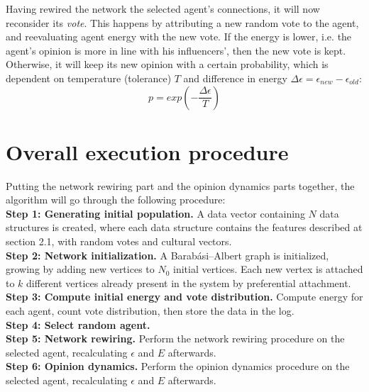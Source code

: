 \documentclass[12pt,openright,twoside]{book}
\begin{document}
Having rewired the network the selected agent's connections, it will now reconsider its \textit{vote}. This happens by attributing a new random vote to the agent, and reevaluating agent energy with the new vote. If the energy is lower, i.e. the agent's opinion is more in line with his influencers', then the new vote is kept. Otherwise, it will keep its new opinion with a certain probability, which is dependent on temperature (tolerance) $T$ and difference in energy $\Delta\epsilon=\epsilon_{new}-\epsilon_{old}$:\\

\begin{equation}
p=exp(-\frac{\Delta\epsilon}{T})
\label{switch_prob}
\end{equation}

\vspace{14pt}

\section{Overall execution procedure}

Putting the network rewiring part and the opinion dynamics parts together, the algorithm will go through the following procedure:\\

\textbf{Step 1: Generating initial population.} A data vector containing $N$ data structures is created, where each data structure contains the features described at section 2.1, with random votes and cultural vectors.\\

\textbf{Step 2: Network initialization.} A Barabási–Albert graph is initialized, growing by adding new vertices to $N_0$ initial vertices. Each new vertex is attached to $k$ different vertices already present in the system by preferential attachment.\\

\textbf{Step 3: Compute initial energy and vote distribution.} Compute energy for each agent, count vote distribution, then store the data in the log.\\

\textbf{Step 4: Select random agent.}\\

\textbf{Step 5: Network rewiring.} Perform the network rewiring procedure on the selected agent, recalculating $\epsilon$ and $E$ afterwards.\\

\textbf{Step 6: Opinion dynamics.} Perform the opinion dynamics procedure on the selected agent, recalculating $\epsilon$ and $E$ afterwards.\\
\end{document}
